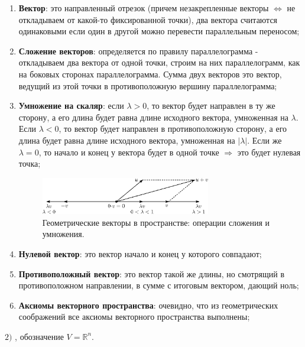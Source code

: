 \documentclass[12pt]{article}
\newcommand{\MR}{\mathbb{R}}
\theoremstyle{definition}
\begin{document}
\begin{enumerate}[label=(\arabic*)]
	\item \textbf{Вектор}: это направленный отрезок (причем незакрепленные векторы $\Leftrightarrow$ не откладываем от какой-то фиксированной точки), два вектора считаются одинаковыми если один в другой можно перевести параллельным переносом;
	
	\item \textbf{Сложение векторов}: определяется по правилу параллелограмма - откладываем два вектора от одной точки, строим на них параллелограмм, как на боковых сторонах параллелограмма. Сумма двух векторов это вектор, ведущий из этой точки в противоположную вершину параллелограмма;
	
	\item \textbf{Умножение на скаляр}: если $\lambda > 0$, то вектор будет направлен в ту же сторону, а его длина будет равна длине исходного вектора, умноженная на $\lambda$. Если $\lambda < 0$, то вектор будет направлен в противоположную сторону, а его длина будет равна длине исходного вектора, умноженная на $|\lambda|$. Если же $\lambda = 0$, то начало и конец у вектора будет в одной точке $\Rightarrow$ это будет нулевая точка;
	\begin{figure}[H]
		\centering
		\includegraphics[width=0.7\textwidth]{AL1_1.eps}
		\caption{Геометрические векторы в пространстве: операции сложения и умножения.}
		\label{1_1}
	\end{figure}

	\item \textbf{Нулевой вектор}: это вектор начало и конец у которого совпадают;
	
	\item \textbf{Противоположный вектор}: это вектор такой же длины, но смотрящий в противоположном направлении,  в сумме с итоговым вектором, дающий ноль;
	
	\item \textbf{Аксиомы векторного пространства}: очевидно, что из геометрических соображений все аксиомы векторного пространства выполнены;
\end{enumerate}


\newpage
$2)$ , обозначение $V = \MR^n$.
\end{document}
